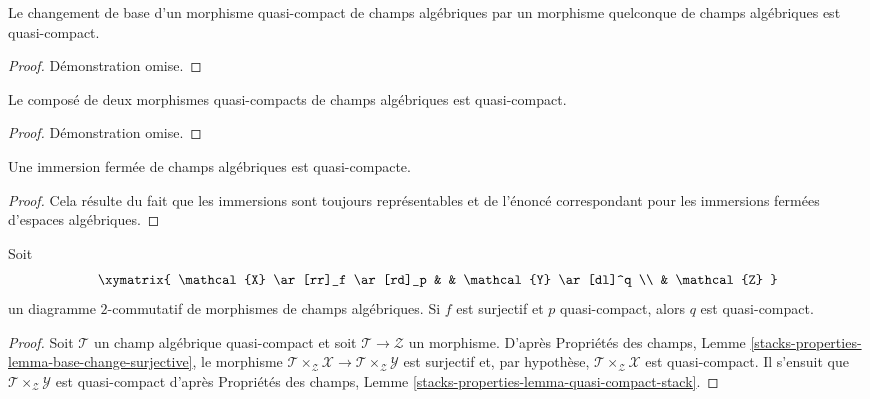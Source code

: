 \begin{lemma}
\label{lemma-base-change-quasi-compact}
Le changement de base d'un morphisme quasi-compact de champs algébriques par
un morphisme quelconque de champs algébriques est quasi-compact.
\end{lemma}

\begin{proof}
Démonstration omise.
\end{proof}

\begin{lemma}
\label{lemma-composition-quasi-compact}
Le composé de deux morphismes quasi-compacts de champs algébriques est
quasi-compact.
\end{lemma}

\begin{proof}
Démonstration omise.
\end{proof}

\begin{lemma}
\label{lemma-closed-immersion-quasi-compact}
Une immersion fermée de champs algébriques est quasi-compacte.
\end{lemma}

\begin{proof}
Cela résulte du fait que les immersions sont toujours représentables et de
l'énoncé correspondant pour les immersions fermées d'espaces algébriques.
\end{proof}

\begin{lemma}
\label{lemma-surjection-from-quasi-compact}
Soit
$$
\xymatrix{
\mathcal{X} \ar[rr]_f \ar[rd]_p & &
\mathcal{Y} \ar[dl]^q \\
& \mathcal{Z}
}
$$
un diagramme $2$-commutatif de morphismes de champs algébriques.
Si $f$ est surjectif et $p$ quasi-compact, alors $q$ est quasi-compact.
\end{lemma}

\begin{proof}
Soit $\mathcal{T}$ un champ algébrique quasi-compact et soit
$\mathcal{T} \to \mathcal{Z}$ un morphisme. D'après
Propriétés des champs,
Lemme \ref{stacks-properties-lemma-base-change-surjective},
le morphisme
$\mathcal{T} \times_\mathcal{Z} \mathcal{X} \to
\mathcal{T} \times_\mathcal{Z} \mathcal{Y}$
est surjectif et, par hypothèse,
$\mathcal{T} \times_\mathcal{Z} \mathcal{X}$ est quasi-compact. Il s'ensuit
que $\mathcal{T} \times_\mathcal{Z} \mathcal{Y}$ est quasi-compact d'après
Propriétés des champs, Lemme
\ref{stacks-properties-lemma-quasi-compact-stack}.
\end{proof}


